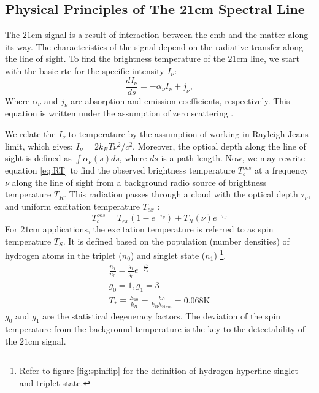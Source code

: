 \documentclass[12pt, TexShade, letterpaper]{report}
\begin{document}
\subsection{Physical Principles of The 21cm Spectral Line}
The $\mathrm{21cm}$ signal is a result of interaction between the \gls{cmb} and the matter along its way. The characteristics of the signal depend on the radiative transfer along the line of sight. To find the brightness temperature of the $\mathrm{21cm}$ line, we start with the basic \gls{rte} for the specific intensity $I_{\nu}$:
\begin{equation}
    \frac{dI_\nu}{ds} = - \alpha_\nu I_\nu + j_\nu ,
    \label{eq:RT}
\end{equation}
Where $\alpha_\nu$ and $j_\nu$ are absorption and emission coefficients, respectively. This equation is written under the assumption of zero scattering \cite{21century, low_frequency}. \par
We relate the $I_\nu$ to temperature by the assumption of working in Rayleigh-Jeans limit, which gives: $I_\nu = 2k_B T \nu^2 /c^2$. Moreover, the optical depth along the line of sight is defined as $\int \alpha_\nu \left(s\right) ds$, where $ds$ is a path length. Now, we may rewrite equation \ref{eq:RT} to find the observed brightness temperature $T^{obs}_b$ at a frequency $\nu$ along the line of sight from a background radio source of brightness temperature $T_R$. This radiation passes through a cloud with the optical depth $\tau_\nu$, and uniform excitation temperature $T_{ex}$ \cite{21century, low_frequency}:
\begin{equation}
    T^{obs}_b = T_{ex} \left(1-e^{-\tau_\nu} \right) + T_R \left (\nu \right) e ^{-\tau_\nu} \label{eq:excitation_T}
\end{equation}
For $\mathrm{21cm}$ applications, the excitation temperature is referred to as spin temperature $T_S$. It is defined based on the population (number densities) of hydrogen atoms in the triplet ($n_0$) and singlet state ($n_1$) \cite{21century, low_frequency} \footnote{Refer to figure \ref{fig:spinflip} for the definition of hydrogen hyperfine singlet and triplet state.}.
\begin{gather}
    \frac{n_1}{n_0} = \frac{g_1}{g_0} e ^ {-\frac{T_*}{T_S}}\\
    g_0 =1, g_1 =3\\
     T_* \equiv \frac{E_{10}}{k_B} = \frac {hc}{k_B\lambda_{21cm}} = 0.068 \mathrm{K}
\end{gather}
$g_0$ and $g_1$ are the statistical degeneracy factors. The deviation of the spin temperature from the background temperature is the key to the detectability of the $\mathrm{21cm}$ signal.\par
\end{document}

